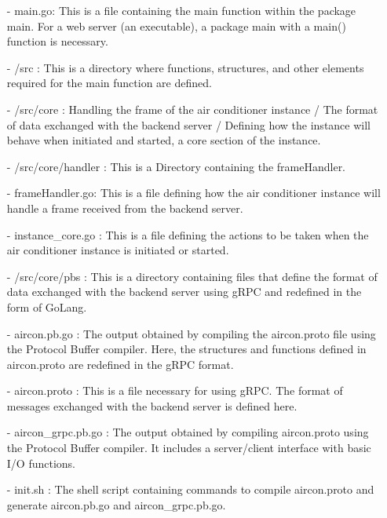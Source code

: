 \documentclass[conference]{IEEEtran}
\begin{document}
\begin{enumerate}
        \item[-] main.go: This is a file containing the main function within the package main. For a web server (an executable), a package main with a main() function is necessary.\\
        \item[-] /src : This is a directory where functions, structures, and other elements required for the main function are defined. \\
        \item[-] /src/core : Handling the frame of the air conditioner instance / The format of data exchanged with the backend server / Defining how the instance will behave when initiated and started, a core section of the instance.\\
        \item[-] /src/core/handler : This is a Directory containing the frameHandler.\\
        \item[-] frameHandler.go: This is a file defining how the air conditioner instance will handle a frame received from the backend server.\\
        \item[-] instance\_core.go : This is a file defining the actions to be taken when the air conditioner instance is initiated or started.\\
        \item[-] /src/core/pbs : This is a directory containing files that define the format of data exchanged with the backend server using gRPC and redefined in the form of GoLang.\\
        \item[-] aircon.pb.go : The output obtained by compiling the aircon.proto file using the Protocol Buffer compiler. Here, the structures and functions defined in aircon.proto are redefined in the gRPC format.\\
        \item[-] aircon.proto : This is a file necessary for using gRPC. The format of messages exchanged with the backend server is defined here.\\
        \item[-] aircon\_grpc.pb.go  : The output obtained by compiling aircon.proto using the Protocol Buffer compiler. It includes a server/client interface with basic I/O functions. \\
        \item[-] init.sh : The shell script containing commands to compile aircon.proto and generate aircon.pb.go and aircon\_grpc.pb.go.\\

\end{enumerate}
\end{document}
